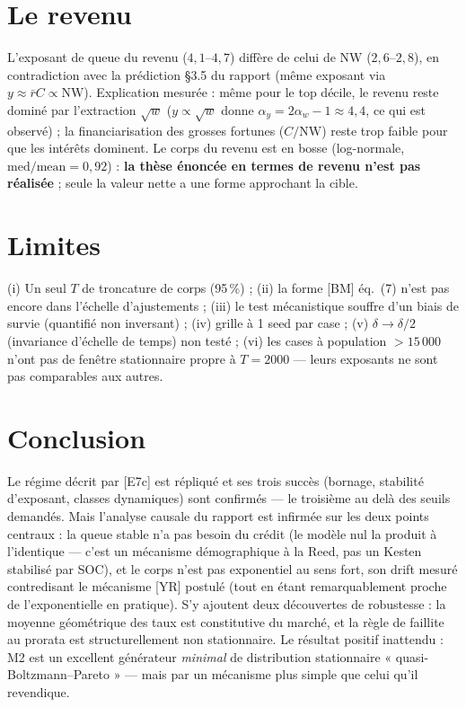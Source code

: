 \documentclass[11pt,a4paper]{article}
\newcommand{\NW}{\mathrm{NW}}
\begin{document}
\section{Le revenu}
L'exposant de queue du revenu ($4{,}1$--$4{,}7$) diffère de celui de $\NW$
($2{,}6$--$2{,}8$), en contradiction avec la prédiction §3.5 du rapport
(même exposant via $y \approx \bar r C \propto \NW$). Explication mesurée :
même pour le top décile, le revenu reste dominé par l'extraction
$\sqrt{w}$ ($y \propto \sqrt{w}$ donne $\alpha_y = 2\alpha_w - 1 \approx
4{,}4$, ce qui est observé) ; la financiarisation des grosses fortunes
($C/\NW$) reste trop faible pour que les intérêts dominent. Le corps du
revenu est en bosse (log-normale, $\mathrm{med}/\mathrm{mean} = 0{,}92$) :
\textbf{la thèse énoncée en termes de revenu n'est pas réalisée} ; seule la
valeur nette a une forme approchant la cible.

\section{Limites}
(i) Un seul $T$ de troncature de corps (95\,\%) ; (ii) la forme [BM]
éq.~(7) n'est pas encore dans l'échelle d'ajustements ; (iii) le test
mécanistique souffre d'un biais de survie (quantifié non inversant) ;
(iv) grille à 1 seed par case ; (v) $\delta \to \delta/2$ (invariance
d'échelle de temps) non testé ; (vi) les cases à population $> 15\,000$
n'ont pas de fenêtre stationnaire propre à $T = 2000$ — leurs exposants ne
sont pas comparables aux autres.

\section{Conclusion}
Le régime décrit par [E7c] est répliqué et ses trois succès (bornage,
stabilité d'exposant, classes dynamiques) sont confirmés — le troisième au
delà des seuils demandés. Mais l'analyse causale du rapport est infirmée sur
les deux points centraux : la queue stable n'a pas besoin du crédit (le
modèle nul la produit à l'identique — c'est un mécanisme démographique à la
Reed, pas un Kesten stabilisé par SOC), et le corps n'est pas exponentiel au
sens fort, son drift mesuré contredisant le mécanisme [YR] postulé (tout en
étant remarquablement proche de l'exponentielle en pratique). S'y ajoutent
deux découvertes de robustesse : la moyenne géométrique des taux est
constitutive du marché, et la règle de faillite au prorata est
structurellement non stationnaire. Le résultat positif inattendu : M2 est un
excellent générateur \emph{minimal} de distribution stationnaire
« quasi-Boltzmann--Pareto » — mais par un mécanisme plus simple que celui
qu'il revendique.
\end{document}
